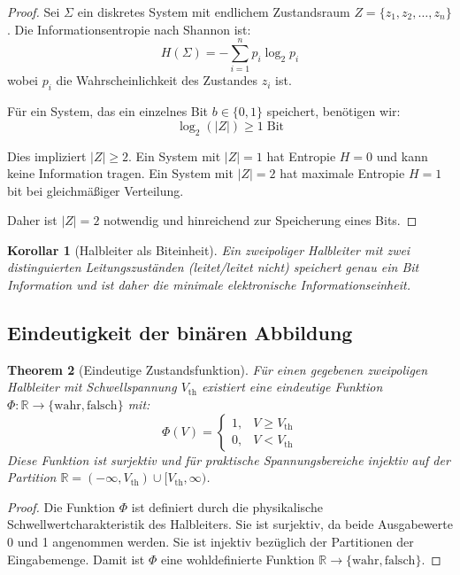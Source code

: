 \documentclass[12pt, a4paper]{article}
\newtheorem{theorem}{Theorem}[section]
\newtheorem{corollary}[theorem]{Korollar}
\theoremstyle{definition}
\theoremstyle{remark}
\newcommand{\R}{\mathbb{R}}
\newcommand{\Bool}{\{\mathrm{wahr}, \mathrm{falsch}\}}
\begin{document}
\begin{proof}
Sei $\Sigma$ ein diskretes System mit endlichem Zustandsraum $Z = \{z_1, z_2, \ldots, z_n\}$. Die Informationsentropie nach Shannon ist:
\[
  H(\Sigma) = -\sum_{i=1}^n p_i \log_2 p_i
\]
wobei $p_i$ die Wahrscheinlichkeit des Zustandes $z_i$ ist.

Für ein System, das ein einzelnes Bit $b \in \{0, 1\}$ speichert, benötigen wir:
\[
  \log_2(|Z|) \geq 1 \;\text{Bit}
\]

Dies impliziert $|Z| \geq 2$. Ein System mit $|Z| = 1$ hat Entropie $H = 0$ und kann keine Information tragen. Ein System mit $|Z| = 2$ hat maximale Entropie $H = 1$ bit bei gleichmäßiger Verteilung.

Daher ist $|Z| = 2$ notwendig und hinreichend zur Speicherung eines Bits.
\end{proof}

\begin{corollary}[Halbleiter als Biteinheit]
\label{cor:halbleiter_bit}
Ein zweipoliger Halbleiter mit zwei distinguierten Leitungszuständen (leitet/leitet nicht) speichert genau ein Bit Information und ist daher die minimale elektronische Informationseinheit.
\end{corollary}

\subsection{Eindeutigkeit der binären Abbildung}
\label{subsec:eindeutigkeit_abbildung}

\begin{theorem}[Eindeutige Zustandsfunktion]
\label{thm:zustandsfunktion_eindeutigkeit}
Für einen gegebenen zweipoligen Halbleiter mit Schwellspannung $V_{\mathrm{th}}$ existiert eine eindeutige Funktion $\Phi: \R \to \Bool$ mit:
\[
  \Phi(V) = \begin{cases} 1, & V \geq V_{\mathrm{th}} \\ 0, & V < V_{\mathrm{th}} \end{cases}
\]
Diese Funktion ist surjektiv und für praktische Spannungsbereiche injektiv auf der Partition $\R = (-\infty, V_{\mathrm{th}}) \cup [V_{\mathrm{th}}, \infty)$.
\end{theorem}

\begin{proof}
Die Funktion $\Phi$ ist definiert durch die physikalische Schwellwertcharakteristik des Halbleiters. Sie ist surjektiv, da beide Ausgabewerte 0 und 1 angenommen werden. Sie ist injektiv bezüglich der Partitionen der Eingabemenge. Damit ist $\Phi$ eine wohldefinierte Funktion $\R \to \Bool$.
\end{proof}
\end{document}
